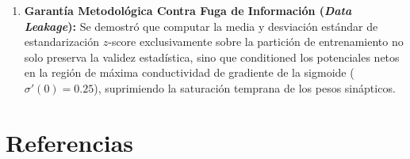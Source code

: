\documentclass[11pt,letterpaper]{article}
\begin{document}
\begin{enumerate}
    \item \textbf{Garantía Metodológica Contra Fuga de Información (\textit{Data Leakage}):} Se demostró que computar la media y desviación estándar de estandarización $z$-score exclusivamente sobre la partición de entrenamiento no solo preserva la validez estadística, sino que conditioned los potenciales netos en la región de máxima conductividad de gradiente de la sigmoide ($\sigma'(0) = 0.25$), suprimiendo la saturación temprana de los pesos sinápticos.
\end{enumerate}

\section{Referencias}
\label{sec:referencias}
\end{document}
